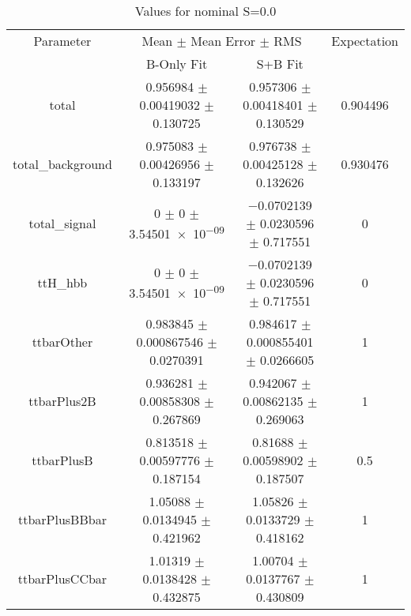 \begin{table}
\centering
\caption{Values for nominal S=0.0}
\begin{tabular}{cccc}
\toprule
Parameter & \multicolumn{2}{c}{Mean $\pm$ Mean Error $\pm$ RMS} & Expectation\\
 & B-Only Fit & S+B Fit & \\
\midrule
total & \num{0.956984} $\pm$ \num{0.00419032} $\pm$ \num{0.130725} & \num{0.957306} $\pm$ \num{0.00418401} $\pm$ \num{0.130529} & \num{0.904496}\\
total\_background & \num{0.975083} $\pm$ \num{0.00426956} $\pm$ \num{0.133197} & \num{0.976738} $\pm$ \num{0.00425128} $\pm$ \num{0.132626} & \num{0.930476}\\
total\_signal & \num{0} $\pm$ \num{0} $\pm$ \num{3.54501e-09} & \num{-0.0702139} $\pm$ \num{0.0230596} $\pm$ \num{0.717551} & \num{0}\\
ttH\_hbb & \num{0} $\pm$ \num{0} $\pm$ \num{3.54501e-09} & \num{-0.0702139} $\pm$ \num{0.0230596} $\pm$ \num{0.717551} & \num{0}\\
ttbarOther & \num{0.983845} $\pm$ \num{0.000867546} $\pm$ \num{0.0270391} & \num{0.984617} $\pm$ \num{0.000855401} $\pm$ \num{0.0266605} & \num{1}\\
ttbarPlus2B & \num{0.936281} $\pm$ \num{0.00858308} $\pm$ \num{0.267869} & \num{0.942067} $\pm$ \num{0.00862135} $\pm$ \num{0.269063} & \num{1}\\
ttbarPlusB & \num{0.813518} $\pm$ \num{0.00597776} $\pm$ \num{0.187154} & \num{0.81688} $\pm$ \num{0.00598902} $\pm$ \num{0.187507} & \num{0.5}\\
ttbarPlusBBbar & \num{1.05088} $\pm$ \num{0.0134945} $\pm$ \num{0.421962} & \num{1.05826} $\pm$ \num{0.0133729} $\pm$ \num{0.418162} & \num{1}\\
ttbarPlusCCbar & \num{1.01319} $\pm$ \num{0.0138428} $\pm$ \num{0.432875} & \num{1.00704} $\pm$ \num{0.0137767} $\pm$ \num{0.430809} & \num{1}\\
\bottomrule
\end{tabular}
\end{table}